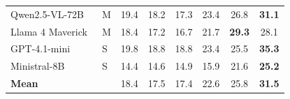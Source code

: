 \begin{table}[t]
\begin{tabular}{@{}llcccccc@{}}
\midrule
Qwen2.5-VL-72B~\cite{bai2025qwen25vl} & M & 19.4 & 18.2 & 17.3 & 23.4 & 26.8 & \textbf{31.1} \\
Llama 4 Maverick~\cite{meta2025llama4} & M & 18.4 & 17.2 & 16.7 & 21.7 & \textbf{29.3} & 28.1 \\
\midrule
GPT-4.1-mini~\cite{openai2025gpt41mini} & S & 19.8 & 18.8 & 18.8 & 23.4 & 25.5 & \textbf{35.3} \\
Ministral-8B~\cite{mistral2024ministral} & S & 14.4 & 14.6 & 14.9 & 15.9 & 21.6 & \textbf{25.2} \\
\midrule
\textbf{Mean} & & 18.4 & 17.5 & 17.4 & 22.6 & 25.8 & \textbf{31.5} \\
\bottomrule
\end{tabular}
\end{table}